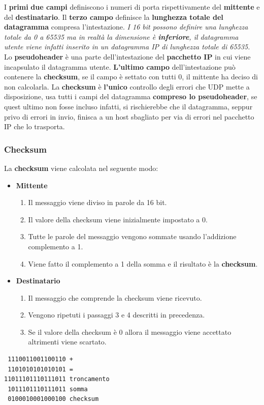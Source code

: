 \documentclass[11pt,a4paper,oneside]{book}
\theoremstyle{definition}
\begin{document}
I \textbf{primi} \textbf{due campi} definiscono i numeri di porta rispettivamente del \textbf{mittente} e del \textbf{destinatario}. Il \textbf{terzo campo} definisce la \textbf{lunghezza totale del datagramma} compresa l'intestazione.\textit{ I 16 bit possono definire una lunghezza totale da 0 a 65535 ma in realtà la dimensione è \textbf{inferiore}, il datagramma utente viene infatti inserito in un datagramma IP di lunghezza totale di 65535.} Lo \textbf{pseudoheader} è una parte dell'intestazione del \textbf{pacchetto IP} in cui viene incapsulato il datagramma utente. \textbf{L'ultimo campo} dell'intestazione può contenere la \textbf{checksum}, se il campo è settato con tutti 0, il mittente ha deciso di non calcolarla. La \textbf{checksum} è \textbf{l'unico} controllo degli errori che UDP mette  a disposizione, usa tutti i campi del datagramma \textbf{compreso lo pseudoheader}, se quest ultimo non fosse incluso infatti, si rischierebbe che il datagramma, seppur privo di errori in invio, finisca a un host sbagliato per via di errori nel pacchetto IP che lo trasporta.

\pagebreak

\subsubsection{Checksum}
La \textbf{checksum} viene calcolata nel seguente modo:
\begin{itemize}
	\item \textbf{Mittente}
	      \begin{enumerate}
		      \item Il messaggio viene diviso in parole da 16 bit.
		      \item Il valore della checksum viene inizialmente impostato a 0.
		      \item Tutte le parole del messaggio vengono sommate usando l'addizione complemento a 1.
		      \item Viene fatto il complemento a 1 della somma e il risultato è la \textbf{checksum}.

	      \end{enumerate}
	\item \textbf{Destinatario}
	      \begin{enumerate}
		      \item Il messaggio che comprende la checksum viene ricevuto.
		      \item Vengono ripetuti i passaggi 3 e 4 descritti in precedenza.
		      \item Se il valore della checksum è 0 allora il messaggio viene accettato altrimenti viene scartato.
	      \end{enumerate}
\end{itemize}
\begin{verbatim}
 1110011001100110 + 
 1101010101010101 =
11011101110111011 troncamento
 1011101110111011 somma
 0100010001000100 checksum
\end{verbatim}
\end{document}
